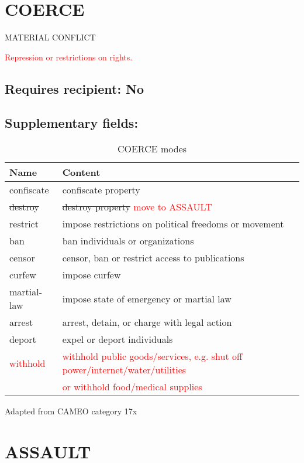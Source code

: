 \documentclass[11pt]{report}
\newcommand{\andy}[1]{\textcolor{red}{#1}}
\begin{document}
\section{COERCE}

\textsf{MATERIAL CONFLICT} \vspace{8pt}

\andy{Repression or restrictions on rights.}
\subsection{Requires recipient: No}

\subsection{Supplementary fields: }

\begin{table}[htp]
\caption{COERCE modes}
\begin{center}
\begin{tabular}{|l|l|}
\hline
Name & Content \\
\hline
confiscate & confiscate property \\
\sout{destroy} & \sout{destroy property} \andy{move to ASSAULT} \\
restrict & impose restrictions on political freedoms or movement \\
ban & ban individuals or organizations \\
censor & censor, ban or restrict access to publications  \\
curfew & impose curfew \\
martial-law & impose state of emergency or martial law \\
arrest & arrest, detain, or charge with legal action \\
deport & expel or deport individuals \\
\andy{withhold} & \andy{withhold public goods/services, e.g. shut off power/internet/water/utilities} \\&\andy{or withhold food/medical supplies} \\
\hline
\end{tabular}
\end{center}
\label{tab:coerce}
Adapted from CAMEO category 17x
\end{table}%

\newpage  


\section{ASSAULT}
\end{document}
